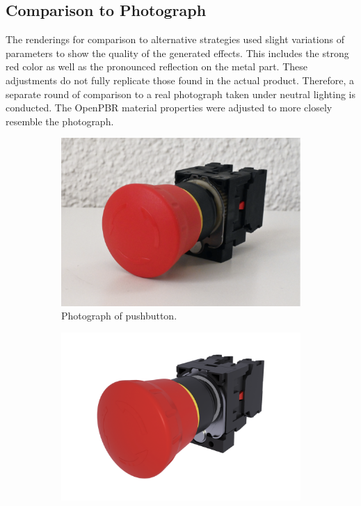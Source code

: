 \newpage
\subsection*{Comparison to Photograph}

The renderings for comparison to alternative strategies used slight variations of parameters to show the quality of the generated effects. This includes the strong red color as well as the pronounced reflection on the metal part. These adjustments do not fully replicate those found in the actual product. Therefore, a separate round of comparison to a real photograph taken under neutral lighting is conducted. The \gls{OpenPBR} material properties were adjusted to more closely resemble the photograph.

\begin{figure}[H]
  \centering
  \hspace*{0.2cm}
  \begin{subfigure}[t]{0.45\textwidth}
    \includegraphics[width=\textwidth]{resources/comparison-real-image.png}
    \caption{Photograph of pushbutton.}
    \label{fig:real-photo}
  \end{subfigure}
  \hfill
  \begin{subfigure}[t]{0.45\textwidth}
    \includegraphics[width=\textwidth]{resources/comparison-real-strahl-rendering.png}

\end{subfigure}
\end{figure}
